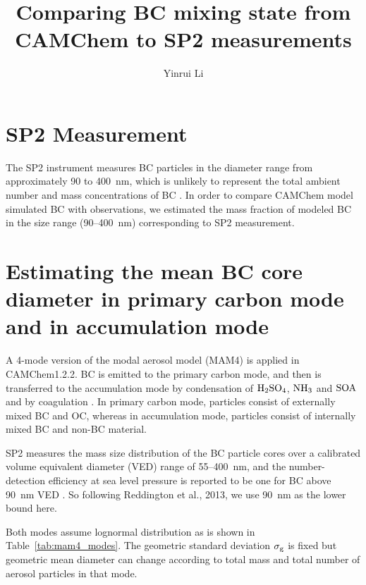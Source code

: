 \documentclass[11pt]{article}
\title{\textbf{Comparing BC mixing state from CAMChem to SP2 measurements}}
\author{Yinrui Li}
\date{}
\begin{document}
\maketitle



\section{SP2 Measurement} 

The SP2 instrument measures BC particles in the diameter range from
approximately 90 to 400~nm, which is unlikely to represent the total
ambient number and mass concentrations of BC \citep{Reddington2013}.  In order to compare CAMChem model simulated BC with
observations, we estimated the mass fraction of modeled BC in the size
range (90--400~nm) corresponding to SP2 measurement.

\section{Estimating the mean BC core diameter in primary carbon mode and in accumulation mode} 

A 4-mode version of the modal aerosol model (MAM4) is applied in
CAMChem1.2.2. BC is emitted to the primary carbon mode, and then is
transferred to the accumulation mode by condensation of
$\rm{H_2SO_4}$, $\rm{NH_3}$ and $\rm{SOA}$ and by coagulation \citep{Liu2012}. In primary carbon mode, particles consist of externally
mixed BC and OC, whereas in accumulation mode, particles consist of
internally mixed BC and non-BC material.

SP2 measures the mass size distribution of the BC particle
cores over a calibrated volume equivalent diameter (VED) range of
55--400~nm, and the number-detection efficiency at sea level pressure
is reported to be one for BC above 90~nm VED \citep{Schwarz2010a}. So following Reddington et al., 2013, we use 90~nm as the
lower bound here.

Both modes assume lognormal distribution as is shown in
Table~\ref{tab:mam4_modes}. The geometric standard deviation $\sigma_{\rm g}$ is fixed but geometric mean diameter can
change according to total mass and total number of aerosol particles
in that mode.
\end{document}
